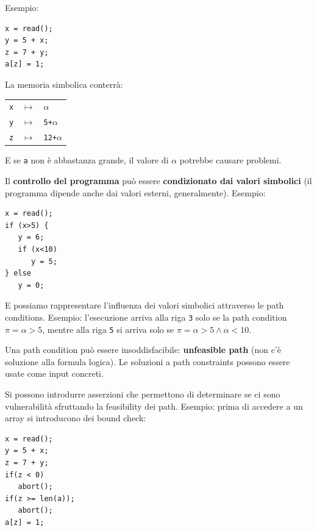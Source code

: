 Esempio: 
\begin{center}
	\begin{minipage}{0.3\linewidth}
		\begin{verbatim}
x = read();
y = 5 + x;
z = 7 + y;
a[z] = 1;
		\end{verbatim}
	\end{minipage}
	\hfill
	\begin{minipage}{0.6\linewidth}
		La memoria simbolica conterrà: 
		\begin{center}
			\begin{tabular}{l l l}
				\texttt{x} & $\mapsto$ & $\alpha$ \\
				\texttt{y} & $\mapsto$ & \texttt{5+$\alpha$} \\
				\texttt{z} & $\mapsto$ & \texttt{12+$\alpha$}
			\end{tabular}
		\end{center}
		E se \texttt{a} non è abbastanza grande, il valore di $\alpha$ potrebbe causare problemi.
	\end{minipage}
\end{center}

Il \textbf{controllo del programma} può essere \textbf{condizionato dai valori simbolici} (il programma dipende anche dai valori esterni, generalmente). Esempio:
\begin{center}
	\begin{minipage}{0.3\linewidth}
		\begin{verbatim}
x = read();
if (x>5) {
   y = 6;
   if (x<10)
      y = 5;
} else 
   y = 0;
		\end{verbatim}
	\end{minipage}
\end{center}

E possiamo rappresentare l'influenza dei valori simbolici attraverso le path conditions. Esempio: l'esecuzione arriva alla riga \texttt{3} solo se la path condition $\pi = \alpha > 5$, mentre alla riga \texttt{5} si arriva solo se $\pi = \alpha > 5 \wedge \alpha < 10$.

Una path condition può essere insoddisfacibile: \textbf{unfeasible path} (non c'è soluzione alla formula logica). Le soluzioni a path constraints possono essere usate come input concreti.

Si possono introdurre asserzioni che permettono di determinare se ci sono vulnerabilità sfruttando la feasibility dei path. Esempio: prima di accedere a un array si introducono dei bound check:
\begin{center}
	\begin{minipage}{0.35\linewidth}
		\begin{verbatim}
x = read();
y = 5 + x;
z = 7 + y;
if(z < 0)
   abort();
if(z >= len(a));
   abort();
a[z] = 1;
		\end{verbatim}
	\end{minipage}
\end{center}


